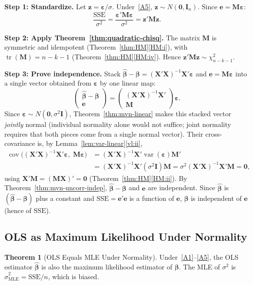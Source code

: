 \documentclass[12pt,a4paper]{article}
\makeatletter
\theoremstyle{definition}
\newtheorem{theorem}{Theorem}[section]
\renewenvironment{proof}[1][\proofname]{\par
  \pushQED{\qed}%
  \normalfont \topsep6\p@\@plus6\p@\relax
  \trivlist
  \item[\hskip\labelsep\bfseries #1\@addpunct{.}]\ignorespaces
}{%
  \popQED\endtrivlist\@endpefalse
}
\DeclareMathOperator\var{var}
\DeclareMathOperator\cov{cov}
\DeclareMathOperator\tr{tr}
\newcommand{\SSE}{\mathrm{SSE}}
\newcommand{\bX}{\mathbf{X}}
\def\bb{\boldsymbol{\beta}}
\newcommand{\be}{\boldsymbol{\varepsilon}}
\newcommand{\bI}{\mathbf{I}}
\newcommand{\bM}{\mathbf{M}}
\newcommand{\bzero}{\mathbf{0}}
\newcommand{\bz}{\mathbf{z}}
\makeatother
\begin{document}
\begin{proof}
\textbf{Step 1: Standardize.} Let $\bz = \be/\sigma$. Under~\ref{A5}, $\bz \sim N(\bzero, \bI_n)$. Since $\mathbf{e} = \bM\be$:
\[
\frac{\SSE}{\sigma^2} = \frac{\be'\bM\be}{\sigma^2} = \bz'\bM\bz.
\]

\textbf{Step 2: Apply Theorem~\ref{thm:quadratic-chisq}.} The matrix $\bM$ is symmetric and idempotent (Theorem~\ref{thm:HM}\ref{HM:i}), with $\tr(\bM) = n - k - 1$ (Theorem~\ref{thm:HM}\ref{HM:iv}). Hence $\bz'\bM\bz \sim \chi^2_{n-k-1}$.

\textbf{Step 3: Prove independence.} Stack $\hat{\bb} - \bb = (\bX'\bX)^{-1}\bX'\be$ and $\mathbf{e} = \bM\be$ into a single vector obtained from $\be$ by one linear map:
\[
\begin{pmatrix}\hat{\bb} - \bb \\ \mathbf{e}\end{pmatrix} = \begin{pmatrix}(\bX'\bX)^{-1}\bX' \\ \bM\end{pmatrix}\be.
\]
Since $\be \sim N(\bzero, \sigma^2\bI)$, Theorem~\ref{thm:mvn-linear} makes this stacked vector \emph{jointly} normal (individual normality alone would not suffice; joint normality requires that both pieces come from a single normal vector). Their cross-covariance is, by Lemma~\ref{lem:var-linear}\ref{vl:ii},
\begin{align*}
\cov\!\bigl((\bX'\bX)^{-1}\bX'\be,\; \bM\be\bigr) &= (\bX'\bX)^{-1}\bX'\var(\be)\bM'\\
&= (\bX'\bX)^{-1}\bX'(\sigma^2\bI)\bM = \sigma^2(\bX'\bX)^{-1}\bX'\bM = \bzero,
\end{align*}
using $\bX'\bM = (\bM\bX)' = \bzero$ (Theorem~\ref{thm:HM}\ref{HM:ii}). By Theorem~\ref{thm:mvn-uncorr-indep}, $\hat{\bb} - \bb$ and $\mathbf{e}$ are independent. Since $\hat{\bb}$ is $(\hat{\bb} - \bb)$ plus a constant and $\SSE = \mathbf{e}'\mathbf{e}$ is a function of $\mathbf{e}$, $\hat{\bb}$ is independent of $\mathbf{e}$ (hence of $\SSE$).
\end{proof}

\subsection{OLS as Maximum Likelihood Under Normality}

\begin{theorem}[OLS Equals MLE Under Normality]\label{thm:mle}
Under~\ref{A1}--\ref{A5}, the OLS estimator $\hat{\bb}$ is also the maximum likelihood estimator of $\bb$. The MLE of $\sigma^2$ is $\hat{\sigma}^2_{\mathrm{MLE}} = \SSE/n$, which is biased.
\end{theorem}
\end{document}
